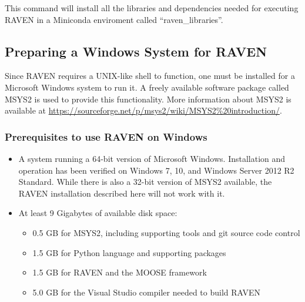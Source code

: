 This command will install all the libraries and dependencies needed for executing RAVEN 
in a Miniconda enviroment called ``raven\_libraries''.

\goToRavenInstallation


\subsection{Preparing a Windows System for RAVEN}
\label{sysprep_windows}

Since RAVEN requires a UNIX-like shell to function, one must be installed for a Microsoft
Windows system to run it.  A freely available software package called MSYS2 is used to
provide this functionality.  More information about MSYS2 is available at
\url{https://sourceforge.net/p/msys2/wiki/MSYS2%20introduction/}.

\subsubsection{Prerequisites to use RAVEN on Windows}
\begin{itemize}
    \item A system running a 64-bit version of Microsoft Windows. Installation and operation
        has been verified on Windows 7, 10, and Windows Server 2012 R2 Standard. While there
        is also a 32-bit version of MSYS2 available, the RAVEN installation described here will not work with it.
    \item At least 9 Gigabytes of available disk space:
    \begin{itemize}
        \item 0.5 GB for MSYS2, including supporting tools and git source code control
        \item 1.5 GB for Python language and supporting packages
        \item 1.5 GB for RAVEN and the MOOSE framework
        \item 5.0 GB for the Visual Studio compiler needed to build RAVEN
    \end{itemize}
\end{itemize}

